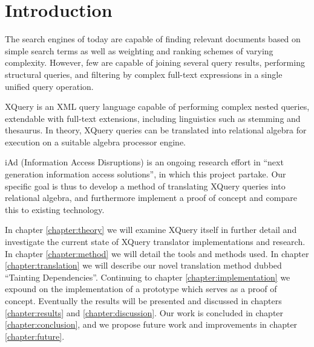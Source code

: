 \chapter{Introduction}
\label{chapter:introduction}
% 


The search engines of today are capable of finding relevant documents based
on simple search terms as well as weighting and ranking schemes of varying
complexity. However, few are capable of joining several query results,
performing structural queries, and filtering by complex full-text expressions
in a single unified query operation. 

XQuery is an XML query language capable of performing complex nested
queries, extendable with full-text extensions, including linguistics such as
stemming and thesaurus. In theory, XQuery queries can be translated into
relational algebra for execution on a suitable algebra processor engine.

iAd \cite{iadcentre} (Information Access Disruptions) is an ongoing research
effort in ``next generation information access solutions'', in which this
project partake. Our specific goal is thus to develop a method of
translating XQuery queries into relational algebra, and furthermore implement a
proof of concept and compare this to existing technology. 

In chapter \ref{chapter:theory} we will examine XQuery itself in further detail
and investigate the current state of XQuery translator implementations and
research. In chapter \ref{chapter:method} we will detail the tools and methods
used. In chapter \ref{chapter:translation} we will describe our novel
translation method dubbed ``Tainting Dependencies''. Continuing to chapter
\ref{chapter:implementation} we expound on the implementation of a prototype
which serves as a proof of concept. Eventually the results will be
presented and discussed in chapters \ref{chapter:results} and
\ref{chapter:discussion}. Our work is concluded in chapter
\ref{chapter:conclusion}, and we propose future work and improvements in
chapter \ref{chapter:future}.